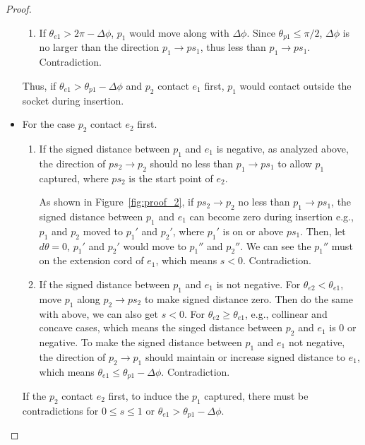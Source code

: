 \documentclass[11pt, twocolumn]{article}
\begin{document}
\begin{proof}
\begin{itemize}
\begin{enumerate}
\item If $\theta_{e1} > 2\pi - \Delta\phi$, $p_1$ would move along with $\Delta\phi$. Since $\theta_{p1} \le \pi/2$, $\Delta\phi$ is no larger than the direction $p_1 \to ps_1$, thus less than $p_1 \to ps_1$. Contradiction.
\end{enumerate}

Thus, if $\theta_{e1} > \theta_{p1} - \Delta\phi$ and $p_2$ contact $e_1$ first, $p_1$ would contact outside the socket during insertion. 

\item For the case $p_2$ contact $e_2$ first. 

\begin{enumerate}
\item If the signed distance between $p_1$ and $e_1$ is negative, as analyzed above, the direction of $ps_2 \to p_2$ should no less than $p_1 \to ps_1$ to allow $p_1$ captured, where $ps_2$ is the start point of $e_2$.

As shown in Figure~\ref{fig:proof_2}, if $ps_2 \to p_2$ no less than $p_1 \to ps_1$, the signed distance between $p_1$ and $e_1$ can become zero during insertion e.g., $p_1$ and $p_2$ moved to $p_1'$ and $p_2'$, where $p_1'$ is on or above $ps_1$. Then, let $d\theta = 0$, $p_1'$ and $p_2'$ would move to $p_1''$ and $p_2''$. We can see the $p_1''$ must on the extension cord of $e_1$, which means $s < 0 $. Contradiction.

\item If the signed distance between $p_1$ and $e_1$ is not negative. For $\theta_{e2} < \theta_{e1}$, move $p_1$ along $p_2 \to ps_2$ to make signed distance zero. Then do the same with above, we can also get $s < 0 $. For $\theta_{e2} \ge \theta_{e1}$, e.g., collinear and concave cases, which means the singed distance between $p_2$ and $e_1$ is 0 or negative. To make the signed distance between $p_1$ and $e_1$ not negative, the direction of $p_2 \to p_1$ should maintain or increase signed distance to $e_1$, which means $\theta_{e1} \le \theta_{p1} - \Delta\phi$. Contradiction.

\end{enumerate}

If the $p_2$ contact $e_2$ first, to induce the $p_1$ captured, there must be contradictions for $0 \le s \le 1 $ or $\theta_{e1} > \theta_{p1} - \Delta\phi$. 




\end{itemize}


\end{proof}
\end{document}
